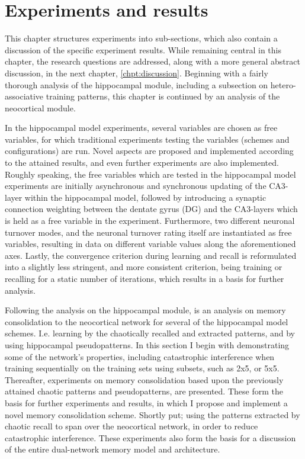 
\chapter{Experiments and results}\label{chpt:experiments}

This chapter structures experiments into sub-sections, which also contain a discussion of the specific experiment results. While remaining central in this chapter, the research questions are addressed, along with a more general abstract discussion, in the next chapter, \ref{chpt:discussion}.
Beginning with a fairly thorough analysis of the hippocampal module, including a subsection on hetero-associative training patterns, this chapter is continued by an analysis of the neocortical module.

In the hippocampal model experiments, several variables are chosen as free variables, for which traditional experiments testing the variables (schemes and configurations) are run. Novel aspects are proposed and implemented according to the attained results, and even further experiments are also implemented.
Roughly speaking, the free variables which are tested in the hippocampal model experiments are initially asynchronous and synchronous updating of the CA3-layer within the hippocampal model, followed by introducing a synaptic connection weighting between the dentate gyrus (DG) and the CA3-layers which is held as a free variable in the experiment. Furthermore, two different neuronal turnover modes, and the neuronal turnover rating itself are instantiated as free variables, resulting in data on different variable values along the aforementioned axes. Lastly, the convergence criterion during learning and recall is reformulated into a slightly less stringent, and more consistent criterion, being training or recalling for a static number of iterations, which results in a basis for further analysis.

Following the analysis on the hippocampal module, is an analysis on memory consolidation to the neocortical network for several of the hippocampal model schemes. I.e. learning by the chaotically recalled and extracted patterns, and by using hippocampal pseudopatterns.
In this section I begin with demonstrating some of the network's properties, including catastrophic interference when training sequentially on the training sets using subsets, such as 2x5, or 5x5. Thereafter, experiments on memory consolidation based upon the previously attained chaotic patterns and pseudopatterns, are presented. These form the basis for further experiments and results, in which I propose and implement a novel memory consolidation scheme. Shortly put; using the patterns extracted by chaotic recall to span over the neocortical network, in order to reduce catastrophic interference. These experiments also form the basis for a discussion of the entire dual-network memory model and architecture.


